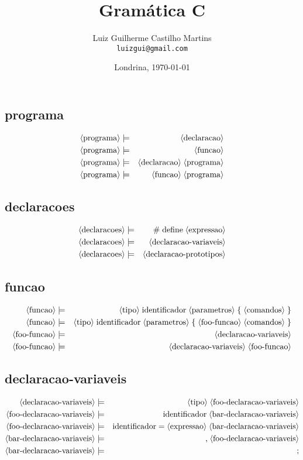 \documentclass[12pt,a4papper]{article}
\title{Gramática C}
\author{Luiz Guilherme Castilho Martins \\
\texttt{luizgui@gmail.com}}
\date{Londrina, \today}
\newcommand{\pn}[1]{\langle \textnormal{#1} \rangle}
\newcommand{\pp}{\models}
\newcommand{\ww}{\;}
\newcommand{\sm}[1]{\textnormal{#1}}
\begin{document}
\begin{landscape}

\subsection{programa}
\begin{eqnarray}
\pn{programa} &\pp& \pn{declaracao} \\
\pn{programa} &\pp& \pn{funcao} \\
\pn{programa} &\pp& \pn{declaracao} \ww \pn{programa} \\
\pn{programa} &\pp& \pn{funcao} \ww \pn{programa} 
\end{eqnarray}


\subsection{declaracoes}
\begin{eqnarray}
\pn{declaracoes} &\pp& \sm{\#} \ww \sm{define} \ww \pn{expressao} \\
\pn{declaracoes} &\pp& \pn{declaracao-variaveis} \\
\pn{declaracoes} &\pp& \pn{declaracao-prototipos}
\end{eqnarray}



\subsection{funcao}
\begin{eqnarray}
        \pn{funcao} &\pp& \pn{tipo} \ww \sm{identificador} \ww \pn{parametros} \ww \sm{\{} \ww \pn{comandos} \ww \sm{\}} \\
        \pn{funcao} &\pp& \pn{tipo} \ww \sm{identificador} \ww \pn{parametros} \ww \sm{\{} \ww  \pn{foo-funcao} \ww \pn{comandos} \ww \sm{\}} \\
    \pn{foo-funcao} &\pp& \pn{declaracao-variaveis} \\
    \pn{foo-funcao} &\pp& \pn{declaracao-variaveis} \ww \pn{foo-funcao}
\end{eqnarray}


\subsection{declaracao-variaveis}
\begin{eqnarray}
\pn{declaracao-variaveis} &\pp& \pn{tipo} \ww \pn{foo-declaracao-variaveis}  \\
\pn{foo-declaracao-variaveis} &\pp& \sm{identificador} \ww \pn{bar-declaracao-variaveis} \\
\pn{foo-declaracao-variaveis} &\pp& \sm{identificador} \ww \sm{$=$} \ww \pn{expressao} \ww \pn{bar-declaracao-variaveis} \\
\pn{bar-declaracao-variaveis} &\pp& \sm{,} \ww \pn{foo-declaracao-variaveis} \\
\pn{bar-declaracao-variaveis} &\pp& \sm{;}
\end{eqnarray}



\end{landscape}
\end{document}
